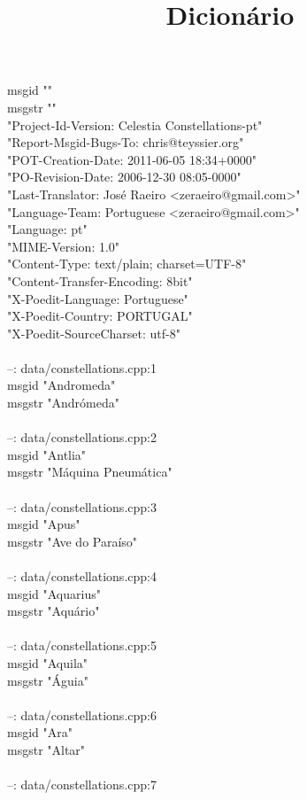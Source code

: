 \documentclass[10pt]{article}
\title{Dicionário}
\begin{document}
msgid ""\\
msgstr ""\\
"Project-Id-Version: Celestia Constellations-pt"\\
"Report-Msgid-Bugs-To: chris@teyssier.org"\\
"POT-Creation-Date: 2011-06-05 18:34+0000"\\
"PO-Revision-Date: 2006-12-30 08:05-0000"\\
"Last-Translator: José Raeiro <zeraeiro@gmail.com>"\\
"Language-Team: Portuguese <zeraeiro@gmail.com>"\\
"Language: pt"\\
"MIME-Version: 1.0"\\
"Content-Type: text/plain; charset=UTF-8"\\
"Content-Transfer-Encoding: 8bit"\\
"X-Poedit-Language: Portuguese"\\
"X-Poedit-Country: PORTUGAL"\\
"X-Poedit-SourceCharset: utf-8"\\
\\
--: data/constellations.cpp:1\\
msgid "Andromeda"\\
msgstr "Andrómeda"\\
\\
--: data/constellations.cpp:2\\
msgid "Antlia"\\
msgstr "Máquina Pneumática"\\
\\
--: data/constellations.cpp:3\\
msgid "Apus"\\
msgstr "Ave do Paraíso"\\
\\
--: data/constellations.cpp:4\\
msgid "Aquarius"\\
msgstr "Aquário"\\
\\
--: data/constellations.cpp:5\\
msgid "Aquila"\\
msgstr "Águia"\\
\\
--: data/constellations.cpp:6\\
msgid "Ara"\\
msgstr "Altar"\\
\\
--: data/constellations.cpp:7\\
\end{document}
